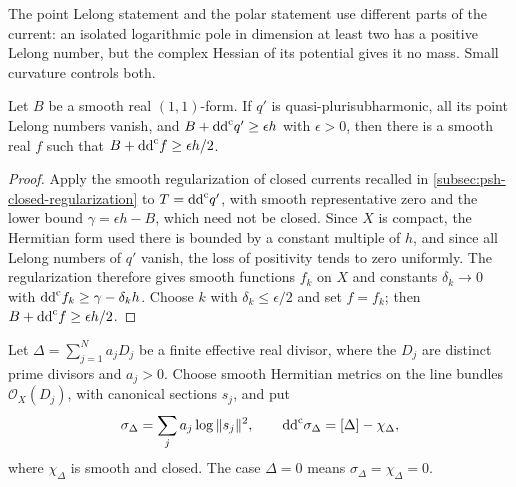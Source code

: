 The point Lelong statement and the polar statement use different parts
of the current: an isolated logarithmic pole in dimension at least two
has a positive Lelong number, but the complex Hessian of its potential
gives it no mass. Small curvature controls both.

\begin{lemma}\label{lem:zero-lelong-strict-smoothing}
Let $B$ be a smooth real $(1,1)$-form. If $q'$ is quasi-plurisubharmonic,
all its point Lelong numbers vanish, and $B+\mathrm{dd}^{\mathrm{c}} q'\geq\epsilon h$ with
$\epsilon>0$, then there is a smooth real $f$ such that
$B+\mathrm{dd}^{\mathrm{c}} f\geq\epsilon h/2$.
\end{lemma}
\begin{proof}
Apply the smooth regularization of closed currents recalled in
\cref{subsec:psh-closed-regularization} to $T=\mathrm{dd}^{\mathrm{c}} q'$, with smooth
representative zero and the lower bound $\gamma=\epsilon h-B$, which
need not be closed. Since $X$ is compact, the Hermitian form used there
is bounded by a constant multiple of $h$, and since all Lelong numbers
of $q'$ vanish, the loss of positivity tends to zero uniformly. The
regularization therefore gives smooth functions $f_k$ on $X$ and
constants $\delta_k\to0$ with $\mathrm{dd}^{\mathrm{c}} f_k\geq\gamma-\delta_kh$. Choose
$k$ with $\delta_k\leq\epsilon/2$ and set $f=f_k$; then
$B+\mathrm{dd}^{\mathrm{c}} f\geq\epsilon h/2$.
\end{proof}

Let $\Delta=\sum_{j=1}^Na_jD_j$ be a finite effective real divisor,
where the $D_j$ are distinct prime divisors and $a_j>0$. Choose smooth
Hermitian metrics on the line bundles $\mathcal O_X(D_j)$, with canonical
sections $s_j$, and put
\[
 \sigma_\Delta=\sum_ja_j\log\|s_j\|^2,\qquad
 \mathrm{dd}^{\mathrm{c}}\sigma_\Delta=[\Delta]-\chi_\Delta,
\]
where $\chi_\Delta$ is smooth and closed. The case $\Delta=0$ means
$\sigma_\Delta=\chi_\Delta=0$.

